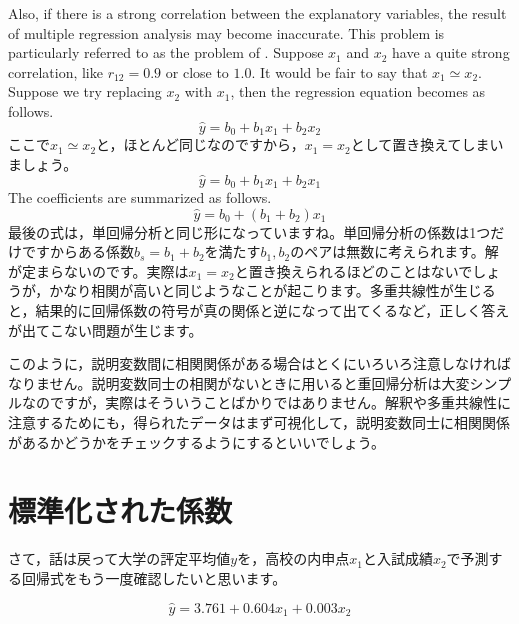 \documentclass{ltjbook}
\begin{document}
Also, if there is a strong correlation between the explanatory variables, the result of multiple regression analysis may become inaccurate. This problem is particularly referred to as the problem of . Suppose $x_1$ and $x_2$ have a quite strong correlation, like $r_{12} = 0.9$ or close to $1.0$.
It would be fair to say that $x_1 \simeq x_2$. Suppose we try replacing $x_2$ with $x_1$, then the regression equation becomes as follows.
\[ \hat{y} = b_0 + b_1 x_1 + b_2x_2 \]
ここで$x_1 \simeq x_2$と，ほとんど同じなのですから，$x_1=x_2$として置き換えてしまいましょう。
\[ \hat{y} = b_0 + b_1 x_1 + b_2x_1 \]
The coefficients are summarized as follows.
\[ \hat{y} = b_0 + (b_1+b_2) x_1 \]
最後の式は，単回帰分析と同じ形になっていますね。単回帰分析の係数は1つだけですからある係数$b_s = b_1 + b_2$を満たす$b_1,b_2$のペアは無数に考えられます。解が定まらないのです。実際は$x_1=x_2$と置き換えられるほどのことはないでしょうが，かなり相関が高いと同じようなことが起こります。多重共線性が生じると，結果的に回帰係数の符号が真の関係と逆になって出てくるなど，正しく答えが出てこない問題が生じます。

このように，説明変数間に相関関係がある場合はとくにいろいろ注意しなければなりません。説明変数同士の相関がないときに用いると重回帰分析は大変シンプルなのですが，実際はそういうことばかりではありません。解釈や多重共線性に注意するためにも，得られたデータはまず可視化して，説明変数同士に相関関係があるかどうかをチェックするようにするといいでしょう。


\section{標準化された係数}

さて，話は戻って大学の評定平均値$y$を，高校の内申点$x_1$と入試成績$x_2$で予測する回帰式をもう一度確認したいと思います。

\[ \hat{y} = 3.761+0.604x_1+0.003x_2 \]
\end{document}
